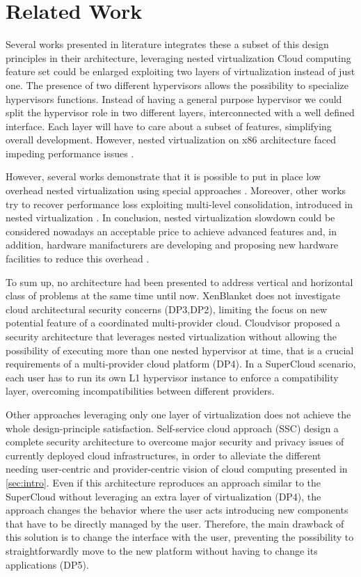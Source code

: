 \documentclass{sig-alternate}
\begin{document}
\section{Related Work}
\label{sec:rw}

Several works presented in literature integrates these a subset of this design principles in their architecture, leveraging nested virtualization \cite{turtle:ibm,art:blan, cloudvisor:zhang}
Cloud computing feature set could be enlarged exploiting two layers of virtualization instead of just one. The presence of two different hypervisors allows the possibility to specialize hypervisors functions. Instead of having a general purpose hypervisor we could split the hypervisor role in two different layers, interconnected with a well defined interface.
Each layer will have to care about a subset of features, simplifying overall development.
However, nested virtualization on x86 architecture faced impeding performance issues \cite{rec:virt}.

However, several works demonstrate that it is possible to put in place low overhead nested virtualization using special approaches \cite{turtle:ibm} . Moreover, other works try to recover performance loss exploiting multi-level consolidation, introduced in nested virtualization \cite{art:blan}. In conclusion, nested virtualization slowdown could be considered nowadays an acceptable price to achieve advanced features and, in addition, hardware manifacturers are developing and proposing new hardware facilities to reduce this overhead \cite{vmcs:nakajima}.

To sum up, no architecture had been presented to address vertical and horizontal class of problems at the same time until now. XenBlanket does not investigate cloud architectural security concerns (DP3,DP2), limiting the focus on new potential feature of a coordinated multi-provider cloud. Cloudvisor proposed a security architecture that leverages nested virtualization without allowing the possibility of executing more than one nested hypervisor at time, that is a crucial requirements of a multi-provider cloud platform (DP4). In a SuperCloud scenario, each user has to run its own L1 hypervisor instance to enforce a compatibility layer, overcoming incompatibilities between different providers.

Other approaches leveraging only one layer of virtualization does not achieve the whole design-principle satisfaction. Self-service cloud approach (SSC) \cite{ssc:art} design a complete security architecture to overcome major security and privacy issues of currently deployed cloud infrastructures, in order to alleviate the different needing user-centric and provider-centric vision of cloud computing presented in \ref{sec:intro}. Even if this architecture reproduces an approach similar to the SuperCloud without leveraging an extra layer of virtualization (DP4), the approach changes the behavior where the user acts introducing new components that have to be directly managed by the user. Therefore, the main drawback of this solution is to change the interface with the user, preventing the possibility to straightforwardly move to the new platform without having to change its applications (DP5).
\end{document}
